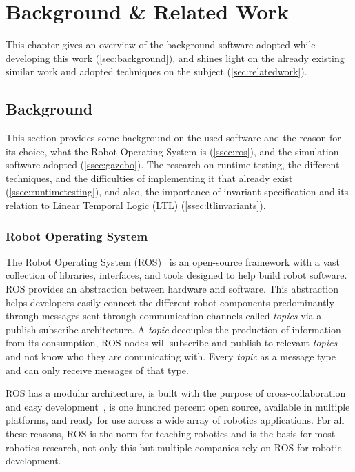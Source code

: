 \chapter{Background \& Related Work}
\label{chap:background}

This chapter gives an overview of the background software adopted while developing this work (\autoref{sec:background}), and shines light on the already existing similar work and adopted techniques on the subject (\autoref{sec:relatedwork}).


\section{Background}
\label{sec:background}

This section provides some background on the used software and the reason for its choice, what the Robot Operating System is (\autoref{ssec:ros}), and the simulation software adopted (\autoref{ssec:gazebo}). The research on runtime testing, the different techniques, and the difficulties of implementing it that already exist (\autoref{ssec:runtimetesting}), and also, the importance of invariant specification and its relation to Linear Temporal Logic (LTL) (\autoref{ssec:ltlinvariants}).


\subsection{Robot Operating System}
\label{ssec:ros}

The Robot Operating System (ROS)~\cite{quigley2009ros} is an open-source framework with a vast collection of libraries, interfaces, and tools designed to help build robot software. ROS provides an abstraction between hardware and software. This abstraction helps developers easily connect the different robot components predominantly through messages sent through communication channels called \textit{topics} via a publish-subscribe architecture. A \textit{topic} decouples the production of information from its consumption, ROS nodes will subscribe and publish to relevant \textit{topics} and not know who they are comunicating with. Every \textit{topic} as a message type and can only receive messages of that type.

ROS has a modular architecture, is built with the purpose of cross-collaboration and easy development~\cite{ros-industrial}, is one hundred percent open source, available in multiple platforms, and ready for use across a wide array of robotics applications. For all these reasons, ROS is the norm for teaching robotics and is the basis for most robotics research, not only this but multiple companies rely on ROS for robotic development.

